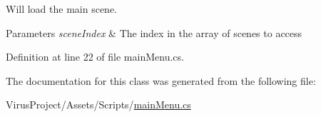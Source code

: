 Will load the main scene.


\begin{DoxyParams}{Parameters}
{\em scene\+Index} & The index in the array of scenes to access \\
\hline
\end{DoxyParams}


Definition at line 22 of file main\+Menu.\+cs.



The documentation for this class was generated from the following file\+:\begin{DoxyCompactItemize}
\item 
Virus\+Project/\+Assets/\+Scripts/\hyperlink{main_menu_8cs}{main\+Menu.\+cs}\end{DoxyCompactItemize}
